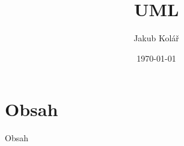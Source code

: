 


\title{UML}
\author{Jakub Kolář}
\date{\today}



	\begin{frame}
		\titlepage
	\end{frame}
	
	\section{Obsah}
	\begin{frame}{Obsah}
		\tableofcontents
	\end{frame}

	



